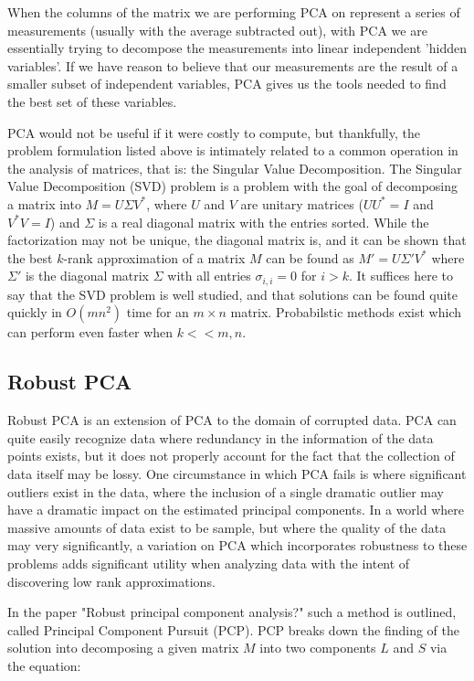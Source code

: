 \documentclass[11pt]{scrartcl} %
\theoremstyle{plain}
\begin{document}
When the columns of the matrix we are performing PCA on represent a series of measurements (usually with the average subtracted out), with PCA we are essentially trying to decompose the measurements into linear independent 'hidden variables'. If we have reason to believe that our measurements are the result of a smaller subset of independent variables, PCA gives us the tools needed to find the best set of these variables.

PCA would not be useful if it were costly to compute, but thankfully, the problem formulation listed above is intimately related to a common operation in the analysis of matrices, that is: the Singular Value Decomposition. The Singular Value Decomposition (SVD) problem is a problem with the goal of decomposing a matrix into $M = U\Sigma V^*$, where $U$ and $V$ are unitary matrices ($UU^* = I$ and $V^*V = I$) and $\Sigma$ is a real diagonal matrix with the entries sorted. While the factorization may not be unique, the diagonal matrix is, and it can be shown that the best $k$-rank approximation of a matrix $M$ can be found as $M' = U \Sigma' V^*$ where $\Sigma'$ is the diagonal matrix $\Sigma$ with all entries $\sigma_{i,i} = 0$ for $i > k$. It suffices here to say that the SVD problem is well studied, and that solutions can be found quite quickly in $O(mn^2)$ time for an $m{\times}n$ matrix. Probabilstic methods exist which can perform even faster when $k << m, n$.

\subsection{Robust PCA}

Robust PCA\cite{pcp} is an extension of PCA to the domain of corrupted data. PCA can quite easily recognize data where redundancy in the information of the data points exists, but it does not properly account for the fact that the collection of data itself may be lossy. One circumstance in which PCA fails is where significant outliers exist in the data, where the inclusion of a single dramatic outlier may have a dramatic impact on the estimated principal components. In a world where massive amounts of data exist to be sample, but where the quality of the data may very significantly, a variation on PCA which incorporates robustness to these problems adds significant utility when analyzing data with the intent of discovering low rank approximations.

In the paper "Robust principal component analysis?"\cite{pcp} such a method is outlined, called Principal Component Pursuit (PCP). PCP breaks down the finding of the solution into decomposing a given matrix $M$ into two components $L$ and $S$ via the equation:
\end{document}
